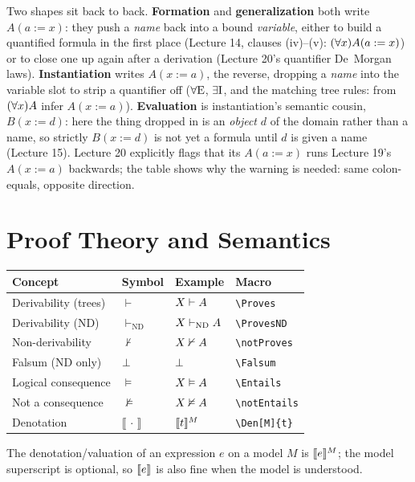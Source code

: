 \documentclass[11pt]{article}
\begin{document}
\noindent
Two shapes sit back to back. \textbf{Formation} and \textbf{generalization} both write $A(a := x)$: they push a \emph{name} back into a bound \emph{variable}, either to build a quantified formula in the first place (Lecture 14, clauses (iv)--(v): $\all{x}A(a:=x)$) or to close one up again after a derivation (Lecture 20's quantifier De~Morgan laws). \textbf{Instantiation} writes $A(x := a)$, the reverse, dropping a \emph{name} into the variable slot to strip a quantifier off ($\AllE$, $\SomeI$, and the matching tree rules: from $\all{x}A$ infer $A(x:=a)$). \textbf{Evaluation} is instantiation's semantic cousin, $B(x := d)$: here the thing dropped in is an \emph{object} $d$ of the domain rather than a name, so strictly $B(x:=d)$ is not yet a formula until $d$ is given a name (Lecture 15). Lecture 20 explicitly flags that its $A(a := x)$ runs Lecture 19's $A(x := a)$ backwards; the table shows why the warning is needed: same colon-equals, opposite direction.

\section{Proof Theory and Semantics}

\begin{center}
\begin{tabular}{@{}llll@{}}
\toprule
Concept & Symbol & Example & Macro \\
\midrule
Derivability (trees)& $\vdash$  & $X \Proves A$        & \verb|\Proves| \\
Derivability (ND)   & $\vdash_{\mathrm{ND}}$ & $X \ProvesND A$ & \verb|\ProvesND| \\
Non-derivability    & $\nvdash$ & $X \notProves A$     & \verb|\notProves| \\
Falsum (ND only)    & $\Falsum$  & $\Falsum$             & \verb|\Falsum| \\
Logical consequence & $\vDash$  & $X \Entails A$       & \verb|\Entails| \\
Not a consequence   & $\nvDash$ & $X \notEntails A$    & \verb|\notEntails| \\
Denotation          & $\llbracket\,\cdot\,\rrbracket$ & $\Den[M]{t}$ & \verb|\Den[M]{t}| \\
\bottomrule
\end{tabular}
\end{center}

\noindent
The denotation/valuation of an expression $e$ on a model $M$ is $\Den[M]{e}$; the model superscript is optional, so $\Den{e}$ is also fine when the model is understood.
\end{document}

